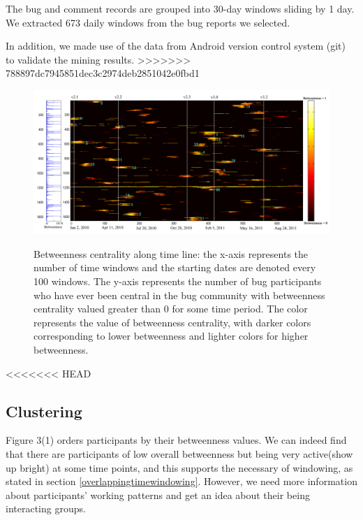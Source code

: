 \documentclass[conference]{IEEEtran}
\begin{document}
The bug and comment records are grouped into 30-day windows sliding by
1 day. 
We extracted 673 daily windows  from the bug reports we selected.

In addition, we made use of the data from Android version control
system (git)
to validate the mining results.
>>>>>>> 788897dc7945851dec3c2974deb2851042e0fbd1


\begin{figure}[ht]
\centering
\includegraphics[width=18cm]{result.pdf}
\label{result}
\caption{Betweenness centrality along time line: the x-axis represents the
number of time windows and the starting dates are denoted every 100
windows. The y-axis represents the number of bug participants who have
ever been central in the bug community with betweenness
centrality valued greater than 0 for some time period. The
color represents the value of betweenness centrality, with darker
colors corresponding to lower betweenness and lighter colors for
higher betweenness. }
\end{figure}


<<<<<<< HEAD

\subsection{Clustering}
Figure 3(1) orders participants by their betweenness values. We can indeed find that there are participants of low overall betweenness but being very active(show up bright) at some time points, and this supports the necessary of windowing, as stated in section \ref{overlappingtimewindowing}. However, we need more information about participants' working patterns and get an idea about their being interacting groups. 
\end{document}
